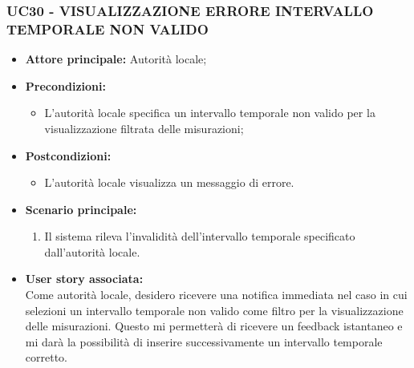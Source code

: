 \subsubsection{UC30 - VISUALIZZAZIONE ERRORE INTERVALLO TEMPORALE NON VALIDO}
\begin{itemize}
      \item \textbf{Attore principale:} Autorità locale;
      \item \textbf{Precondizioni:}
            \begin{itemize} 
                  \item L'autorità locale specifica un intervallo temporale non valido per la visualizzazione filtrata delle misurazioni;
            \end{itemize}
            \item \textbf{Postcondizioni:}
            \begin{itemize}
                  \item L'autorità locale visualizza un messaggio di errore.
            \end{itemize}
            \item \textbf{Scenario principale:}
            \begin{enumerate}
                  \item Il sistema rileva l'invalidità dell'intervallo temporale specificato dall'autorità locale.
                  \end{enumerate}
      \item \textbf{User story associata:} \\
            Come autorità locale, desidero ricevere una notifica immediata nel caso in cui selezioni un intervallo temporale non valido come filtro per la visualizzazione delle misurazioni. Questo mi permetterà di ricevere un feedback istantaneo e mi darà la possibilità di inserire successivamente un intervallo temporale corretto.
\end{itemize}